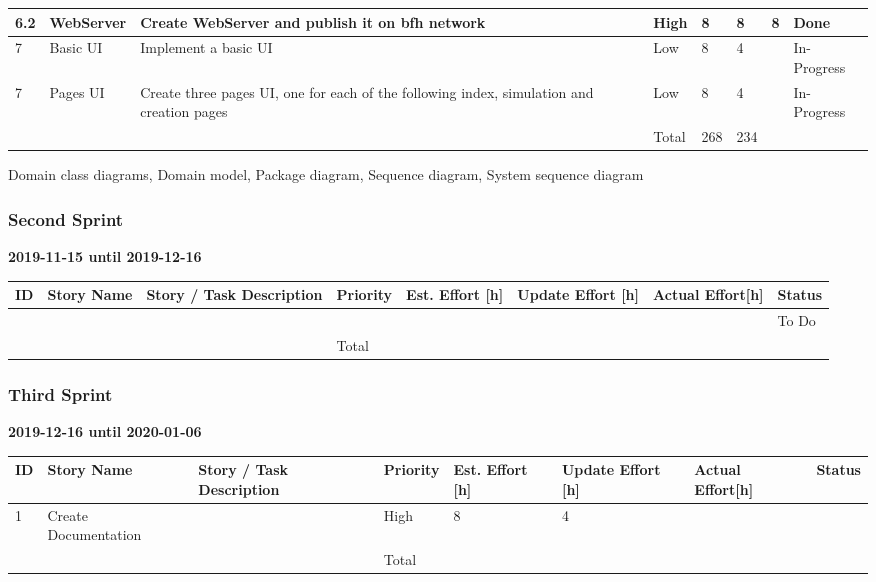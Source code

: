 \documentclass{scrartcl}
\begin{document}
\begin{table}[]
\begin{tabular}{l|l|l|l|l|l|l|l}
  \multicolumn{1}{|l|}{6.2} & WebServer & Create WebServer and publish it on bfh network & High & 8 & 8 & 8 & \multicolumn{1}{l|}{Done} \\ \hline
  \multicolumn{1}{|l|}{7} & Basic UI & Implement a basic UI & Low & 8 & 4 &  & \multicolumn{1}{l|}{In-Progress} \\ \hline
  \multicolumn{1}{|l|}{7} & Pages UI & Create three pages UI, one for each of the following index, simulation and creation pages & Low & 8 & 4 &  & \multicolumn{1}{l|}{In-Progress} \\ \hline
  \multicolumn{1}{|l|}{} &  &  & Total & 268 & 234 &  & \multicolumn{1}{l|}{} \\ \hline
\end{tabular}
\end{table}

Domain class diagrams,
Domain model,
Package diagram,
Sequence diagram,
System sequence diagram
\subsubsection{Second Sprint}
\textbf{2019-11-15 until 2019-12-16}
\begin{table}[]
  \begin{tabular}{l|l|l|l|l|l|l|l}
  ID                     & Story Name & Story / Task Description & Priority & Est. Effort {[}h{]} & Update Effort {[}h{]} & Actual Effort{[}h{]} & Status                \\ \hline
  \multicolumn{1}{|l|}{} &  &  &  &  &  &  & \multicolumn{1}{l|}{To Do} \\ \hline
  \multicolumn{1}{|l|}{} &  &  & Total &  &  &  & \multicolumn{1}{l|}{} \\ \hline
\end{tabular}
\end{table}

\subsubsection{Third Sprint}
\textbf{2019-12-16 until 2020-01-06}
\begin{table}[]
  \begin{tabular}{l|l|l|l|l|l|l|l}
  ID                     & Story Name & Story / Task Description & Priority & Est. Effort {[}h{]} & Update Effort {[}h{]} & Actual Effort{[}h{]} & Status                \\ \hline
  \multicolumn{1}{|l|}{1} & Create Documentation &  & High & 8 & 4 &  & \multicolumn{1}{l|}{} \\ \hline
  \multicolumn{1}{|l|}{} &  &  & Total &  &  &  & \multicolumn{1}{l|}{} \\ \hline
\end{tabular}
\end{table}
\end{document}
